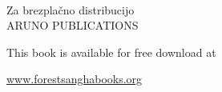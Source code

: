 
{\pagestyle{empty}

{\raggedleft\setlength{\parskip}{1em}\setlength{\parindent}{0em}

\vspace*{5\baselineskip}
{\fontsize{22}{25}\shakerLightFont\color{textbody} \MakeUppercase{\thetitle}%
\par\vspace*{\baselineskip}\vspace*{-0.1\baselineskip} {\fontsize{12}{15}\shakerLightFont \thesubtitle\\
\theauthor

}}

\vfill

{\shakerLightFont%
Za brezplačno distribucijo\\
ARUNO PUBLICATIONS

This book is available for free download at

\vspace*{-0.8\baselineskip}%
{\fontsize{10}{12}\shakerLightFont\href{http://www.forestsanghabooks.org/}{www.forestsanghabooks.org}}%

}}}


